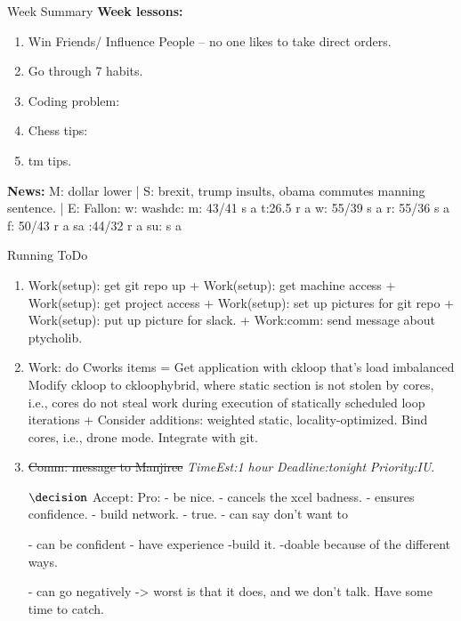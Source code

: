 \documentclass[serif, mathserif, final]{beamer}
\newcommand{\doneTask}[1]{\tiny \item \tiny \sout{#1}}
\newcommand{\te}[1]{\textit{TimeEst:}\textit{#1}}
\newcommand{\dl}[1]{\textit{Deadline:}\textit{#1}}
\newcommand{\pr}[1]{\textit{Priority:}\textit{#1}}
\begin{document}
\begin{frame}
\begin{columns}
\begin{column}{0.5\linewidth}
\begin{block}{Week Summary}
    {\tiny {\bf Week lessons:}}
    \begin{enumerate}
      \tiny \item \tiny Win Friends/ Influence People – no one
      likes to take direct orders.
    \item \tiny Go through 7 habits.
    \item \tiny Coding problem: 
    \item \tiny Chess tips: 
    \item \tiny tm tips.
    \end{enumerate}
        {{\tiny {\bf News:}} M: dollar lower | S: brexit, trump
          insults, obama commutes manning sentence. 
          | E: Fallon:  
          w: washdc: {m: {43/41 s a}}  t:{26.5 r a} {w: {55/39 s a}} {r:
            {55/36 s a}} {f: {50/43 r a   }} {sa :{44/32 r a} }
          {su: { s a  }  } }
  \end{block}

  \begin{block}{Running ToDo} %
    \begin{enumerate} 
      
    {\bf Curr} $\rightarrow$ \\
    
  \item \tiny Work(setup): get git repo up + Work(setup): get
    machine access + Work(setup): get project access + Work(setup):
    set up pictures for git repo + Work(setup): put up picture for
    slack. +  Work:comm: send message about ptycholib. 
    

  \item \tiny Work: do Cworks items = Get application with ckloop
    that’s load imbalanced Modify ckloop to ckloophybrid, where
    static section is not stolen by cores, i.e., cores do not steal
    work during execution of statically scheduled loop iterations +
    Consider additions: weighted static, locality-optimized. Bind
    cores, i.e., drone mode. Integrate with git.
    
    \doneTask{Comm: message to Manjiree} \te{1 hour} \dl{tonight} \pr{IU}. 

    $\decision$
    Accept: 
    Pro: 
    - be nice. 
    - cancels the xcel badness. 
    - ensures confidence. 
    - build network. - true. 
    - can say don't want to 

    - can be confident - have experience -build it. -doable because of
    the different ways. 

    - can go negatively -> worst is that it does, and we don't
    talk. Have some time to catch. 
 

\end{enumerate}
\end{block}
\end{column}
\end{columns}
\end{frame}
\end{document}
